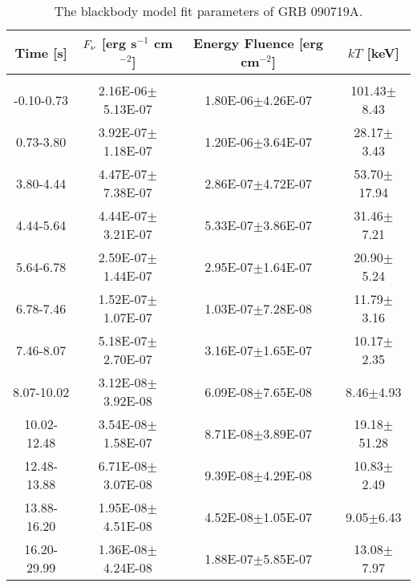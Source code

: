 \begin{table}[h]
\centering
\scriptsize
\label{tab:}
\begin{tabular}{c| c c c}
Time [s] & $F_{\nu}$ [erg s$^{-1}$ cm$^{-2}$] & Energy Fluence [erg cm$^{-2}$] & $kT$ [keV] \\
\hline \hline\\ 

-0.10-0.73 & 2.16E-06$\pm$5.13E-07 & 1.80E-06$\pm$4.26E-07 & 101.43$\pm$8.43 \\ 

0.73-3.80 & 3.92E-07$\pm$1.18E-07 & 1.20E-06$\pm$3.64E-07 & 28.17$\pm$3.43 \\ 

3.80-4.44 & 4.47E-07$\pm$7.38E-07 & 2.86E-07$\pm$4.72E-07 & 53.70$\pm$17.94 \\ 

4.44-5.64 & 4.44E-07$\pm$3.21E-07 & 5.33E-07$\pm$3.86E-07 & 31.46$\pm$7.21 \\ 

5.64-6.78 & 2.59E-07$\pm$1.44E-07 & 2.95E-07$\pm$1.64E-07 & 20.90$\pm$5.24 \\ 

6.78-7.46 & 1.52E-07$\pm$1.07E-07 & 1.03E-07$\pm$7.28E-08 & 11.79$\pm$3.16 \\ 

7.46-8.07 & 5.18E-07$\pm$2.70E-07 & 3.16E-07$\pm$1.65E-07 & 10.17$\pm$2.35 \\ 

8.07-10.02 & 3.12E-08$\pm$3.92E-08 & 6.09E-08$\pm$7.65E-08 & 8.46$\pm$4.93 \\ 

10.02-12.48 & 3.54E-08$\pm$1.58E-07 & 8.71E-08$\pm$3.89E-07 & 19.18$\pm$51.28 \\ 

12.48-13.88 & 6.71E-08$\pm$3.07E-08 & 9.39E-08$\pm$4.29E-08 & 10.83$\pm$2.49 \\ 

13.88-16.20 & 1.95E-08$\pm$4.51E-08 & 4.52E-08$\pm$1.05E-07 & 9.05$\pm$6.43 \\ 

16.20-29.99 & 1.36E-08$\pm$4.24E-08 & 1.88E-07$\pm$5.85E-07 & 13.08$\pm$7.97 \\ 

\end{tabular}
\caption{The blackbody model fit parameters of GRB 090719A.}
\end{table}

